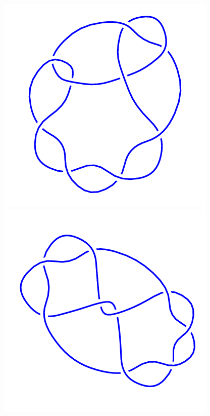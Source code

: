 \begin{figure}[H]
\begin{minipage}[b]{.18\linewidth}
    \end{minipage}
    \begin{minipage}[b]{.18\linewidth}
        \centering
        \includegraphics[width=\linewidth]{../data/9_8.png}
    \end{minipage}
    \begin{minipage}[b]{.18\linewidth}
        \centering
        \includegraphics[width=\linewidth]{../data/9_9.png}

\end{minipage}
\end{figure}
